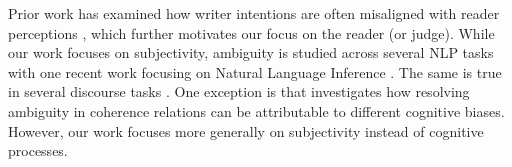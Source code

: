 Prior work has examined how writer intentions are often misaligned with reader perceptions \cite{Chang:2020}, which further motivates our focus on the reader (or judge). While our work focuses on subjectivity, ambiguity is studied across several NLP tasks with one recent work focusing on Natural Language Inference \cite{Pavlick:2019,Chen:2020}. The same is true in several discourse tasks \cite{Poesio:2019,Das:2017,Asher:2003,Versley:2011,Webber:2012,Webber:2019b}. One exception is  that investigates how resolving ambiguity in coherence relations can be attributable to different cognitive biases. However, our work focuses more generally on subjectivity instead of cognitive processes.   




